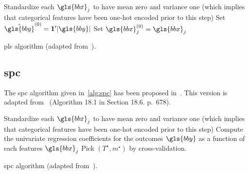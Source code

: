 \begin{algorithm}[H]
Standardize each $\gls{bbx}_j$ to have mean zero and variance one (which implies that categorical features have been one-hot encoded prior to this step) \;
Set $\hat{\gls{bby}}^{(0)} = \mathbf{1}' |\gls{bby}|$\;
Set $\gls{bbx}_j^{(0)} = \gls{bbx}_j$\;
 \caption{\label{alg:pls} \gls{pls} algorithm (adapted from~\cite{friedman2001elements}).}
\end{algorithm}


\subsection{\gls{spc}} \label{app1:sec_spc}

The \gls{spc} algorithm given in~\eqref{alg:spc} has been proposed in~\cite{bair2006prediction}. This version is adapted from~\cite{friedman2001elements} (Algorithm 18.1 in Section 18.6. p.\ 678).

\begin{algorithm}[H]
Standardize each $\gls{bbx}_j$ to have mean zero and variance one (which implies that categorical features have been one-hot encoded prior to this step) \;
Compute the univariate regression coefficients for the outcomes $\gls{bby}$ as a function of each features $\gls{bbx}_j$\;
Pick $(T^\star, m^\star)$ by cross-validation.
 \caption{\label{alg:spc} \gls{spc} algorithm (adapted from~\cite{friedman2001elements}).}
\end{algorithm}

